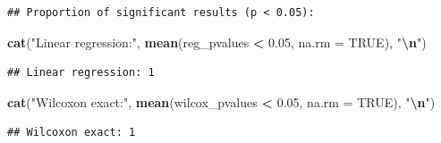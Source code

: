 \documentclass[
]{article}
\newenvironment{Shaded}{\begin{snugshade}}{\end{snugshade}}
\newcommand{\AttributeTok}[1]{\textcolor[rgb]{0.13,0.29,0.53}{#1}}
\newcommand{\CommentTok}[1]{\textcolor[rgb]{0.56,0.35,0.01}{\textit{#1}}}
\newcommand{\ConstantTok}[1]{\textcolor[rgb]{0.56,0.35,0.01}{#1}}
\newcommand{\FloatTok}[1]{\textcolor[rgb]{0.00,0.00,0.81}{#1}}
\newcommand{\FunctionTok}[1]{\textcolor[rgb]{0.13,0.29,0.53}{\textbf{#1}}}
\newcommand{\NormalTok}[1]{#1}
\newcommand{\SpecialCharTok}[1]{\textcolor[rgb]{0.81,0.36,0.00}{\textbf{#1}}}
\newcommand{\StringTok}[1]{\textcolor[rgb]{0.31,0.60,0.02}{#1}}
\begin{document}
\begin{Shaded}
\end{Shaded}

\begin{verbatim}
## Proportion of significant results (p < 0.05):
\end{verbatim}

\begin{Shaded}
\begin{Highlighting}[]
\FunctionTok{cat}\NormalTok{(}\StringTok{"Linear regression:"}\NormalTok{, }\FunctionTok{mean}\NormalTok{(reg\_pvalues }\SpecialCharTok{\textless{}} \FloatTok{0.05}\NormalTok{, }\AttributeTok{na.rm =} \ConstantTok{TRUE}\NormalTok{), }\StringTok{"}\SpecialCharTok{\textbackslash{}n}\StringTok{"}\NormalTok{)}
\end{Highlighting}
\end{Shaded}

\begin{verbatim}
## Linear regression: 1
\end{verbatim}

\begin{Shaded}
\begin{Highlighting}[]
\FunctionTok{cat}\NormalTok{(}\StringTok{"Wilcoxon exact:"}\NormalTok{, }\FunctionTok{mean}\NormalTok{(wilcox\_pvalues }\SpecialCharTok{\textless{}} \FloatTok{0.05}\NormalTok{, }\AttributeTok{na.rm =} \ConstantTok{TRUE}\NormalTok{), }\StringTok{"}\SpecialCharTok{\textbackslash{}n}\StringTok{"}\NormalTok{)}
\end{Highlighting}
\end{Shaded}

\begin{verbatim}
## Wilcoxon exact: 1
\end{verbatim}
\end{document}
